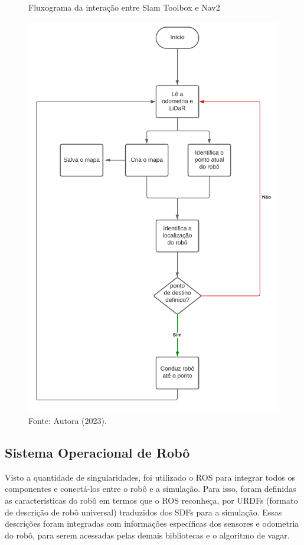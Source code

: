 \begin{figure}[h]
    \centering
    \caption{Fluxograma da interação entre Slam Toolbox e Nav2}
    \includegraphics[scale=0.5]{fluxogramaComando.png}
   
    \caption*{Fonte: Autora (2023).}
    \label{fig:fluxogramaComando}
\end{figure}

\subsection{Sistema Operacional de Robô}

Visto a quantidade de singularidades, foi utilizado o ROS para integrar todos os componentes e conectá-los entre o robô e a simulação. Para isso, foram definidas as características do robô em termos que o ROS reconheça, por URDFs (formato de descrição de robô universal) traduzidos dos SDFs para a simulação. Essas descrições foram integradas com informações específicas dos sensores e odometria do robô, para serem acessadas pelas demais bibliotecas e o algoritmo de vagar.

